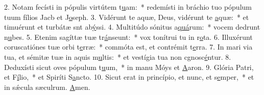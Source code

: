 2. Notam fecísti in pópulis virtútem t\uline{u}am:~* redemísti in bráchio tuo pópulum tuum fílios Jacb et J\uline{o}seph.
3. Vidérunt te aquæ, Deus, vidérunt te \uline{a}quæ:~* et timuérunt et turbátæ snt ab\uline{ý}ssi.
4. Multitúdo sónitus a\uline{quá}rum:~* vocem dedrunt n\uline{u}bes.
5. Etenim sagíttæ tuæ tr\uline{á}nseunt:~* vox tonítrui tu in r\uline{o}ta.
6. Illuxérunt coruscatiónes tuæ orbi t\uline{e}rræ:~* commóta est, et contrémit t\uline{e}rra.
7. In mari via tua, et sémitæ tuæ in aquis m\uline{u}ltis:~* et vestígia tua non cgnosc\uline{é}ntur.
8. Deduxísti sicut oves pópulum t\uline{u}um,~* in manu Móys et \uline{A}aron.
9. Glória Patri, et F\uline{í}lio,~* et Spiríti S\uline{a}ncto.
10. Sicut erat in princípio, et nunc, et s\uline{e}mper,~* et in sǽcula sæculrum. \uline{A}men.
